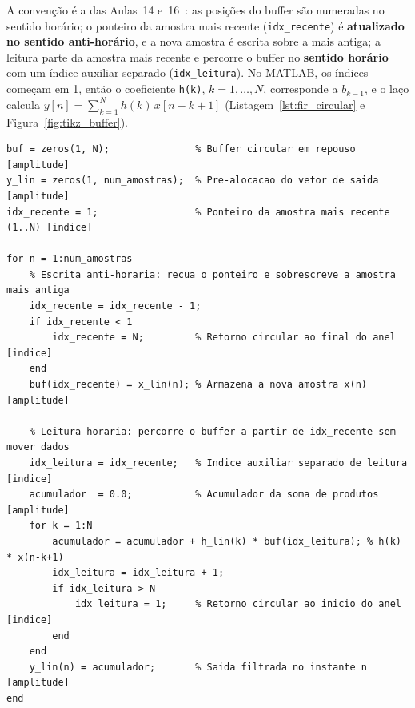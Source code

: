 \documentclass[11pt,a4paper]{article}
\begin{document}
A convenção é a das Aulas~14 e~16~\cite{aula14, aula16}: as posições do buffer são numeradas no sentido horário; o ponteiro da amostra mais recente (\texttt{idx\_recente}) é \textbf{atualizado no sentido anti-horário}, e a nova amostra é escrita sobre a mais antiga; a leitura parte da amostra mais recente e percorre o buffer no \textbf{sentido horário} com um índice auxiliar separado (\texttt{idx\_leitura}). No MATLAB, os índices começam em 1, então o coeficiente \texttt{h(k)}, $k = 1, \dots, N$, corresponde a $b_{k-1}$, e o laço calcula $y[n] = \sum_{k=1}^{N} h(k)\,x[n-k+1]$ (Listagem~\ref{lst:fir_circular} e Figura~\ref{fig:tikz_buffer}).

\begin{lstlisting}[style=matlabstyle, float=!htbp, caption={Trecho essencial de \texttt{src/fir\_circular.m}.}, label={lst:fir_circular}]
buf = zeros(1, N);               % Buffer circular em repouso [amplitude]
y_lin = zeros(1, num_amostras);  % Pre-alocacao do vetor de saida [amplitude]
idx_recente = 1;                 % Ponteiro da amostra mais recente (1..N) [indice]

for n = 1:num_amostras
    % Escrita anti-horaria: recua o ponteiro e sobrescreve a amostra mais antiga
    idx_recente = idx_recente - 1;
    if idx_recente < 1
        idx_recente = N;         % Retorno circular ao final do anel [indice]
    end
    buf(idx_recente) = x_lin(n); % Armazena a nova amostra x(n) [amplitude]

    % Leitura horaria: percorre o buffer a partir de idx_recente sem mover dados
    idx_leitura = idx_recente;   % Indice auxiliar separado de leitura [indice]
    acumulador  = 0.0;           % Acumulador da soma de produtos [amplitude]
    for k = 1:N
        acumulador = acumulador + h_lin(k) * buf(idx_leitura); % h(k) * x(n-k+1)
        idx_leitura = idx_leitura + 1;
        if idx_leitura > N
            idx_leitura = 1;     % Retorno circular ao inicio do anel [indice]
        end
    end
    y_lin(n) = acumulador;       % Saida filtrada no instante n [amplitude]
end
\end{lstlisting}
\end{document}
